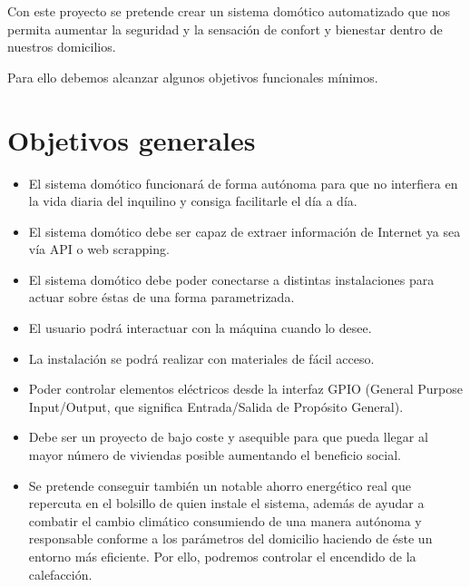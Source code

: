 
Con este proyecto se pretende crear un sistema domótico automatizado que nos permita aumentar la seguridad y la sensación de confort y bienestar dentro de nuestros domicilios.

Para ello debemos alcanzar algunos objetivos funcionales mínimos.

\section{Objetivos generales}

\begin{itemize}
    \item El sistema domótico funcionará de forma autónoma para que no interfiera en la vida diaria del inquilino y consiga facilitarle el día a día.
    \item El sistema domótico debe ser capaz de extraer información de Internet ya sea vía API o web scrapping.
    \item El sistema domótico debe poder conectarse a distintas instalaciones para actuar sobre éstas de una forma parametrizada.
    \item El usuario podrá interactuar con la máquina cuando lo desee.
    \item La instalación se podrá realizar con materiales de fácil acceso.
    \item Poder controlar elementos eléctricos desde la interfaz GPIO (General Purpose Input/Output, que significa Entrada/Salida de Propósito General).
    \item Debe ser un proyecto de bajo coste y asequible para que pueda llegar al mayor número de viviendas posible aumentando el beneficio social.
    \item Se pretende conseguir también un notable ahorro energético real que repercuta en el bolsillo de quien instale el sistema, además de ayudar a combatir el cambio climático consumiendo de una manera autónoma y responsable conforme a los parámetros del domicilio haciendo de éste un entorno más eficiente. Por ello, podremos controlar el encendido de la calefacción.
\end{itemize}

